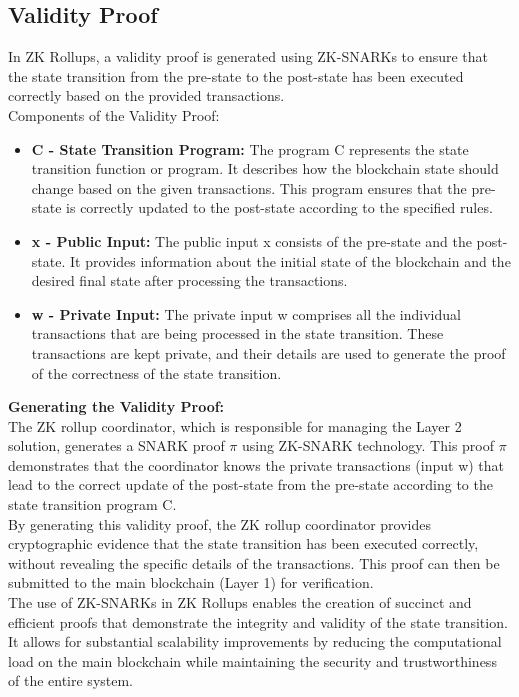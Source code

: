 \subsection{Validity Proof}
In ZK Rollups, a validity proof is generated using ZK-SNARKs to ensure that the state transition from the pre-state to the post-state has been executed correctly based on the provided transactions.\\
Components of the Validity Proof:\\
\begin{itemize}
	\item \textbf{C - State Transition Program:} The program C represents the state transition function or program. It describes how the blockchain state should change based on the given transactions. This program ensures that the pre-state is correctly updated to the post-state according to the specified rules.
	\item \textbf{x - Public Input:} The public input x consists of the pre-state and the post-state. It provides information about the initial state of the blockchain and the desired final state after processing the transactions.
	\item \textbf{w - Private Input:} The private input w comprises all the individual transactions that are being processed in the state transition. These transactions are kept private, and their details are used to generate the proof of the correctness of the state transition.
\end{itemize}
\textbf{Generating the Validity Proof:}\\
The ZK rollup coordinator, which is responsible for managing the Layer 2 solution, generates a SNARK proof $\pi$ using ZK-SNARK technology. This proof $\pi$ demonstrates that the coordinator knows the private transactions (input w) that lead to the correct update of the post-state from the pre-state according to the state transition program C.\\
By generating this validity proof, the ZK rollup coordinator provides cryptographic evidence that the state transition has been executed correctly, without revealing the specific details of the transactions. This proof can then be submitted to the main blockchain (Layer 1) for verification.\\
The use of ZK-SNARKs in ZK Rollups enables the creation of succinct and efficient proofs that demonstrate the integrity and validity of the state transition. It allows for substantial scalability improvements by reducing the computational load on the main blockchain while maintaining the security and trustworthiness of the entire system.

